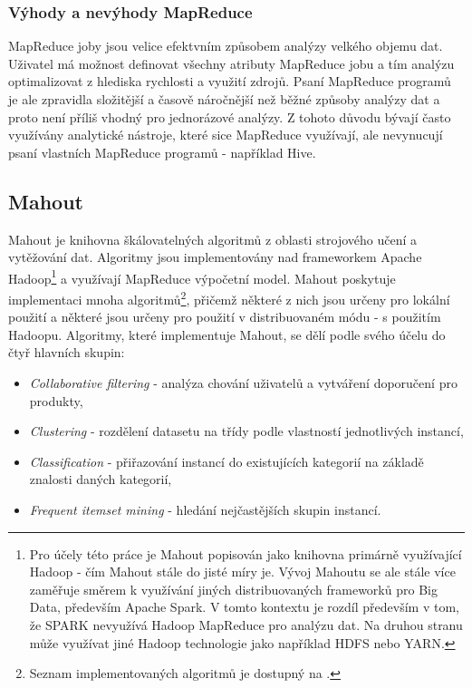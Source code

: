 \documentclass[11pt,twoside,a4paper]{book}
\begin{document}
			\subsubsection{Výhody a nevýhody MapReduce}
			MapReduce joby jsou velice efektvním způsobem analýzy velkého objemu dat. Uživatel má možnost definovat všechny atributy MapReduce jobu a tím analýzu optimalizovat z hlediska rychlosti a využití zdrojů. Psaní MapReduce programů je ale zpravidla složitější a časově náročnější než běžné způsoby analýzy dat a proto není příliš vhodný pro jednorázové analýzy. Z tohoto důvodu bývají často využívány analytické nástroje, které sice MapReduce využívají, ale nevynucují psaní vlastních MapReduce programů - například Hive. 

		\subsection{Mahout}  \label{sec:mahout}
			Mahout je knihovna škálovatelných algoritmů z oblasti strojového učení a vytěžování dat. Algoritmy jsou implementovány nad frameworkem Apache Hadoop\footnote{Pro účely této práce je Mahout popisován jako knihovna primárně využívající Hadoop - čím Mahout stále do jisté  míry je. Vývoj Mahoutu se ale stále více zaměřuje směrem k využívání jiných distribuovaných frameworků pro Big Data, především Apache Spark.\cite{spark01} V tomto kontextu je rozdíl především v tom, že SPARK nevyužívá Hadoop MapReduce pro analýzu dat. Na druhou stranu může využívat jiné Hadoop technologie jako například HDFS nebo YARN.\cite{yarn01}} a využívají MapReduce výpočetní model. Mahout poskytuje implementaci mnoha algoritmů\footnote{Seznam implementovaných algoritmů je dostupný na \cite{mahout01}.}, přičemž některé z nich jsou určeny pro lokální použití a některé jsou určeny pro použití v distribuovaném módu - s použitím Hadoopu. Algoritmy, které implementuje Mahout, se dělí podle svého účelu do čtyř hlavních skupin: 
\begin{itemize}
\item{\textit{Collaborative filtering}} - analýza chování uživatelů a vytváření doporučení pro produkty,
\item{\textit{Clustering}} - rozdělení datasetu na třídy podle vlastností jednotlivých instancí,
\item{\textit{Classification}} - přiřazování instancí do existujících kategorií na základě znalosti daných kategorií,
\item{\textit{Frequent itemset mining}} - hledání nejčastějších skupin instancí.
\end{itemize}
 		
\end{document}
